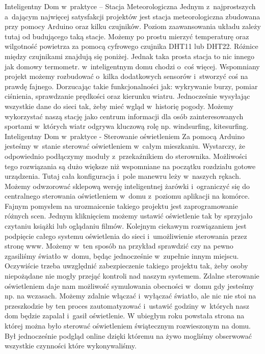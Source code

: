 \documentclass{xmgr}
\begin{document}
	Inteligentny Dom w~praktyce – Stacja Meteorologiczna
	Jednym z~najprostszych a~dającym najwięcej satysfakcji projektów jest stacja meteorologiczna zbudowana przy pomocy Arduino oraz kilku czujników. Poziom zaawansowania układu zależy tutaj od budującego taką stacje. Możemy po prostu mierzyć temperaturę oraz wilgotność powietrza za pomocą cyfrowego czujnika DHT11 lub DHT22. Różnice między czujnikami znajdują się poniżej. 
	Jednak taka prosta stacja to nic innego jak domowy termometr. w~inteligentnym domu chodzi o~coś więcej. Wspomniany projekt możemy rozbudować o~kilka dodatkowych sensorów i~stworzyć coś na prawdę fajnego. 
	Dorzucając takie funkcjonalności jak: wykrywanie burzy, pomiar ciśnienia, sprawdzanie prędkości oraz kierunku wiatru. Jednocześnie wysyłając wszystkie dane do sieci tak, żeby mieć wgląd w~historię pogody. Możemy wykorzystać naszą stację jako centrum informacji dla osób zainteresowanych sportami w~których wiatr odgrywa kluczową rolę np. windsurfing, kitesurfing. 
	Inteligentny Dom w~praktyce - Sterowanie oświetleniem
	Za pomocą Arduino jesteśmy w~stanie sterować oświetleniem w~całym mieszkaniu. Wystarczy, że odpowiednio podłączymy moduły z~przekaźnikiem do sterownika. Możliwości tego rozwiązania są dużo większe niż wspomniane na początku rozdziału gotowe urządzenia. Tutaj cała konfiguracja i~pole manewru leży w~naszych rękach. Możemy odwzorować sklepową wersję inteligentnej żarówki i~ograniczyć się do centralnego sterowania oświetleniem w~domu z~poziomu aplikacji na komórce.
	Fajnym pomysłem na urozmaicenie takiego projektu jest zaprogramowanie różnych scen. Jednym kliknięciem możemy ustawić oświetlenie tak by sprzyjało czytaniu książki lub oglądaniu filmów.
	Kolejnym ciekawym rozwiązaniem jest podpięcie całego systemu oświetlenia do sieci i~umożliwienie sterowania przez stronę www. Możemy w~ten sposób na przykład sprawdzić czy na pewno zgasiliśmy światło w~domu, będąc jednocześnie w~zupełnie innym miejscu. Oczywiście trzeba uwzględnić zabezpieczenie takiego projektu tak, żeby osoby niepożądane nie mogły przejąć kontroli nad naszym systemem. Zdalne sterowanie oświetleniem daje nam możliwość symulowania obecności w~domu gdy jesteśmy np. na wczasach. Możemy zdalnie włączać i~wyłączać światło, ale nic nie stoi na przeszkodzie by ten proces zautomatyzować i~ustawić godziny w~których nasz dom będzie zapalał i~gasił oświetlenie.
	W ubiegłym roku powstała strona na której można było sterować oświetleniem świątecznym rozwieszonym na domu. Był jednocześnie podgląd online dzięki któremu na żywo mogliśmy obserwować wszystkie czynności które wykonywaliśmy. 
\end{document}
